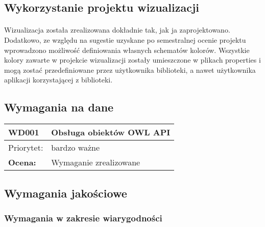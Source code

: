\documentclass[a4paper,10pt]{article}
\begin{document}
\subsection{Wykorzystanie projektu wizualizacji}

\paragraph{} Wizualizacja została zrealizowana dokładnie tak, jak ja zaprojektowano. Dodatkowo, ze względu na sugestie uzyskane po semestralnej ocenie projektu wprowadzono możliwość definiowania własnych schematów kolorów. Wszystkie kolory zawarte w projekcie wizualizacji zostały umieszczone w plikach properties i mogą zostać przedefiniowane przez użytkownika biblioteki, a nawet użytkownika aplikacji korzystającej z biblioteki.


\subsection{Wymagania na dane}


\begin{center}

\begin{tabular}{|m{3cm}|m{9cm}|} \hline

WD001 & Obsługa obiektów OWL API \\ \hline
Priorytet: &  bardzo ważne \\ \hline
\textbf{Ocena:} & Wymaganie zrealizowane\\ \hline
\end{tabular}

\end{center}

\subsection{Wymagania jakościowe}


\subsubsection{Wymagania w zakresie wiarygodności}
\end{document}
